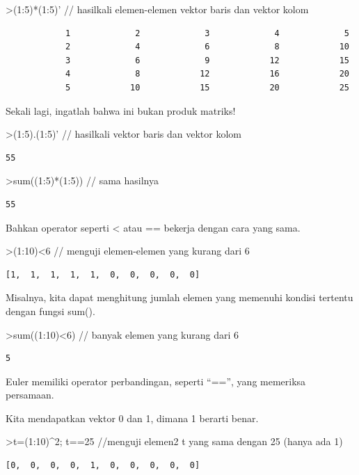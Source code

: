 \documentclass[
]{book}
\begin{document}
\textgreater(1:5)*(1:5)' // hasilkali elemen-elemen vektor baris dan vektor kolom

\begin{verbatim}
            1             2             3             4             5 
            2             4             6             8            10 
            3             6             9            12            15 
            4             8            12            16            20 
            5            10            15            20            25 
\end{verbatim}

Sekali lagi, ingatlah bahwa ini bukan produk matriks!

\textgreater(1:5).(1:5)' // hasilkali vektor baris dan vektor kolom

\begin{verbatim}
55
\end{verbatim}

\textgreater sum((1:5)*(1:5)) // sama hasilnya

\begin{verbatim}
55
\end{verbatim}

Bahkan operator seperti \textless{} atau == bekerja dengan cara yang sama.

\textgreater(1:10)\textless6 // menguji elemen-elemen yang kurang dari 6

\begin{verbatim}
[1,  1,  1,  1,  1,  0,  0,  0,  0,  0]
\end{verbatim}

Misalnya, kita dapat menghitung jumlah elemen yang memenuhi kondisi tertentu dengan fungsi sum().

\textgreater sum((1:10)\textless6) // banyak elemen yang kurang dari 6

\begin{verbatim}
5
\end{verbatim}

Euler memiliki operator perbandingan, seperti ``=='', yang memeriksa persamaan.

Kita mendapatkan vektor 0 dan 1, dimana 1 berarti benar.

\textgreater t=(1:10)\^{}2; t==25 //menguji elemen2 t yang sama dengan 25 (hanya ada 1)

\begin{verbatim}
[0,  0,  0,  0,  1,  0,  0,  0,  0,  0]
\end{verbatim}
\end{document}
